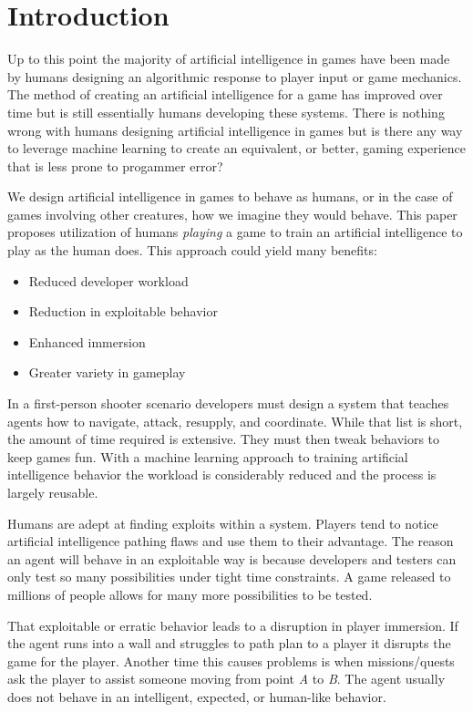 \documentclass[12pt]{thesis}
\begin{document}
\body


\chapter{Introduction}
Up to this point the majority of artificial intelligence in games have been 
made by humans designing an algorithmic response to player input or game 
mechanics\cite{NestedIF}. The method of creating an artificial intelligence for 
a game has improved over time\cite{AdvancedIF} but is still essentially humans 
developing these systems. There is nothing wrong with humans designing 
artificial intelligence in games but is there any way to leverage machine 
learning to create an equivalent, or better, gaming experience that is less 
prone to progammer error?

We design artificial intelligence in games to behave as humans, or in the case 
of games involving other creatures, how we imagine they would behave. This 
paper proposes utilization of humans \textit{playing} a game to train an 
artificial intelligence to play as the human does. This approach could yield 
many benefits:

\begin{itemize}
    \item Reduced developer workload
    \item Reduction in exploitable behavior
    \item Enhanced immersion
    \item Greater variety in gameplay
\end{itemize}

In a first-person shooter scenario developers must design a system that teaches 
agents how to navigate, attack, resupply, and coordinate. While that list is 
short, the amount of time required is extensive. They must then tweak behaviors 
to keep games fun\cite{Fairness}. With a machine learning approach to training 
artificial intelligence behavior the workload is considerably reduced and the 
process is largely reusable. 

Humans are adept at finding exploits within a system. Players tend to notice 
artificial intelligence pathing flaws and use them to their advantage. The 
reason an agent will behave in an exploitable way is because developers and 
testers can only test so many possibilities under tight time constraints. A 
game released to millions of people allows for many more possibilities to be 
tested. 

That exploitable or erratic behavior leads to a disruption in player immersion. 
If the agent runs into a wall and struggles to path plan to a player it 
disrupts the game for the player. Another time this causes problems is when 
missions/quests ask the player to assist someone moving from point \textit{A} 
to \textit{B}. The agent usually does not behave in an intelligent, expected, 
or human-like behavior. 
\end{document}
